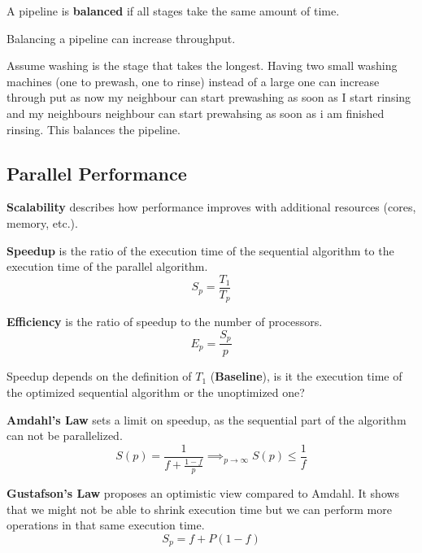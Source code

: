 \begin{definition}
    A pipeline is \textbf{balanced } if all stages take the same amount of time.
\end{definition}

Balancing a pipeline can increase throughput.

\begin{example}
    Assume washing is the stage that takes the longest. Having two small washing machines (one to prewash, one to rinse) instead of a large
    one can increase through put as now my neighbour can start prewashing as soon as I start rinsing and my neighbours neighbour can start prewahsing as soon as i am finished rinsing.
    This balances the pipeline.
\end{example}

\subsection{Parallel Performance}

\begin{definition}
    \textbf{Scalability } describes how performance improves with additional resources (cores, memory, etc.).        
\end{definition}

\begin{definition}
    \textbf{Speedup } is the ratio of the execution time of the sequential algorithm to the execution time of the parallel algorithm.
    $$S_p = \frac{T_1}{T_p}$$
\end{definition}

\begin{definition}
    \textbf{Efficiency } is the ratio of speedup to the number of processors.
    $$E_p = \frac{S_p}{p}$$
\end{definition}

\begin{remark}
    Speedup depends on the definition of $T_1$ (\textbf{Baseline}), is it the execution time of the optimized sequential
    algorithm or the unoptimized one?
\end{remark}

\begin{theorem}
    \textbf{Amdahl's Law } sets a limit on speedup, as the sequential part of the algorithm can not be parallelized.
    $$S(p) = \frac{1}{f + \frac{1-f}{p}} \implies_{p \to \infty} S(p) \leq \frac{1}{f}$$
\end{theorem}


\begin{theorem}
    \textbf{Gustafson's Law } proposes an optimistic view compared to Amdahl. It shows that we might not be able to shrink execution time but we can perform more operations in that same execution time.
    $$S_p = f + P(1 - f)$$
\end{theorem}

